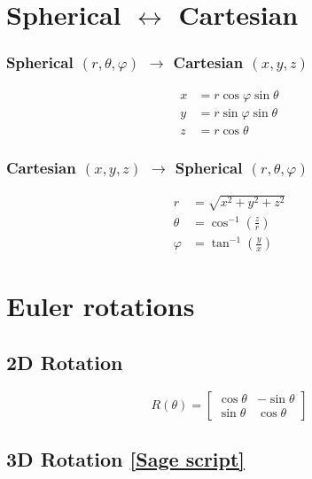 \documentclass{book}
\newcommand{\phase}{\varphi}
\newcommand{\linktosage}[1]{\hyperref[#1]{[Sage script]}}
\begin{document}
\section{Spherical $\leftrightarrow$ Cartesian}

\subsubsection{Spherical $(r,\theta,\phase)$ $\rightarrow$ Cartesian $(x,y,z)$}
\begin{equation}
    \begin{aligned}
        x &= r \cos\phase\sin\theta \\
        y &= r \sin\phase\sin\theta \\
        z &= r \cos\theta
    \end{aligned}
\end{equation}
\subsubsection{Cartesian $(x,y,z)$ $\rightarrow$ Spherical $(r,\theta,\phase)$}
\begin{equation}
    \begin{aligned}
        r &= \sqrt{x^2+y^2+z^2} \\
        \theta &= \cos^{-1} \left(\frac{z}{r}\right) \\
        \phase &= \tan^{-1} \left(\frac{y}{x}\right)
    \end{aligned}
\end{equation}

\section{Euler rotations}

\subsection{2D Rotation}

\begin{equation}
    R(\theta) = \begin{bmatrix}
        \cos\theta & -\sin\theta \\
        \sin\theta & \cos\theta
    \end{bmatrix}
\end{equation}

\subsection{3D Rotation \linktosage{sage:3Drotation}}
\end{document}
